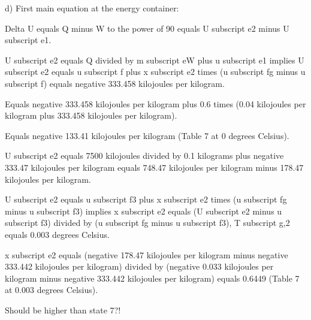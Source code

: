 d) First main equation at the energy container:

Delta U equals Q minus W to the power of 90 equals U subscript e2 minus U subscript e1.

U subscript e2 equals Q divided by m subscript eW plus u subscript e1 implies U subscript e2 equals u subscript f plus x subscript e2 times (u subscript fg minus u subscript f) equals negative 333.458 kilojoules per kilogram.

Equals negative 333.458 kilojoules per kilogram plus 0.6 times (0.04 kilojoules per kilogram plus 333.458 kilojoules per kilogram).

Equals negative 133.41 kilojoules per kilogram (Table 7 at 0 degrees Celsius).

U subscript e2 equals 7500 kilojoules divided by 0.1 kilograms plus negative 333.47 kilojoules per kilogram equals 748.47 kilojoules per kilogram minus 178.47 kilojoules per kilogram.

U subscript e2 equals u subscript f3 plus x subscript e2 times (u subscript fg minus u subscript f3) implies x subscript e2 equals (U subscript e2 minus u subscript f3) divided by (u subscript fg minus u subscript f3), T subscript g,2 equals 0.003 degrees Celsius.

x subscript e2 equals (negative 178.47 kilojoules per kilogram minus negative 333.442 kilojoules per kilogram) divided by (negative 0.033 kilojoules per kilogram minus negative 333.442 kilojoules per kilogram) equals 0.6449 (Table 7 at 0.003 degrees Celsius).

Should be higher than state 7?!